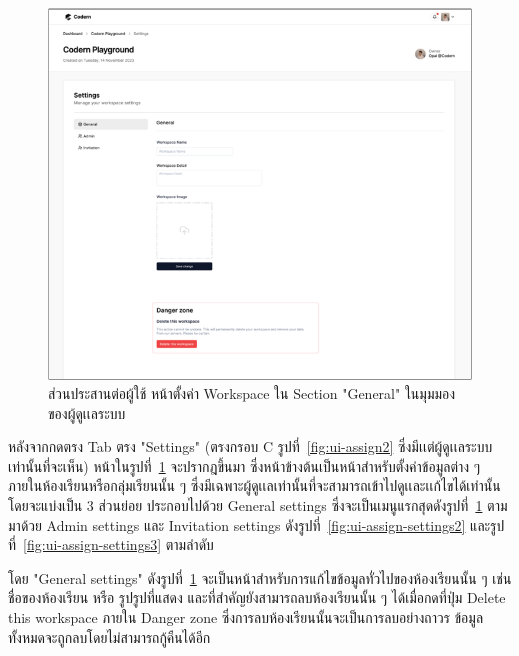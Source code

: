 \documentclass[12pt,one side,openright,a4paper]{cpe-thesis-th}
\newcommand{\thaijustify}[1]{%
  \par\hspace{30pt}\justifying
  #1
}
\begin{document}
    \hypertarget{ui-assign-settings1}{
        \begin{figure}[H]
        \centering
            \includegraphics[width=15cm]{figure/ui/ui-assign-settings1.png}
            \caption[ส่วนประสานต่อผู้ใช้ หน้าตั้งค่า Workspace ใน Section "General" ในมุมมองของผู้ดูเเลระบบ]{ส่วนประสานต่อผู้ใช้ หน้าตั้งค่า Workspace ใน Section "General" ในมุมมองของผู้ดูเเลระบบ}
            \label{fig:ui-assign-settings1}
        \end{figure}
    }
    \thaijustify{
         หลังจากกดตรง Tab ตรง "Settings" (ตรงกรอบ C รูปที่~\ref{fig:ui-assign2} ซึ่งมีเเต่ผู้ดูเเลระบบเท่านั้นที่จะเห็น) หน้าในรูปที่~\ref{fig:ui-assign-settings1} จะปรากฎขึ้นมา ซึ่งหน้าข้างต้นเป็นหน้าสำหรับตั้งค่าข้อมูลต่าง ๆ ภายในห้องเรียนหรือกลุ่มเรียนนั้น ๆ ซึ่งมีเฉพาะผู้ดูเเลเท่านั้นที่จะสามารถเข้าไปดูเเละเเก้ไขได้เท่านั้น โดยจะแบ่งเป็น 3 ส่วนย่อย ประกอบไปด้วย General settings ซึ่งจะเป็นเมนูแรกสุดดังรูปที่~\ref{fig:ui-assign-settings1} ตามมาด้วย Admin settings และ Invitation settings ดังรูปที่~\ref{fig:ui-assign-settings2} และรูปที่~\ref{fig:ui-assign-settings3} ตามลำดับ
    }
    \thaijustify{
        โดย "General settings" ดังรูปที่~\ref{fig:ui-assign-settings1} จะเป็นหน้าสำหรับการแก้ไขข้อมูลทั่วไปของห้องเรียนนั้น ๆ เช่น ชื่อของห้องเรียน หรือ รูปรูปที่แสดง และที่สำคัญยังสามารถลบห้องเรียนนั้น ๆ ได้เมื่อกดที่ปุ่ม Delete this workspace ภายใน Danger zone ซึ่งการลบห้องเรียนนั้นจะเป็นการลบอย่างถาวร ข้อมูลทั้งหมดจะถูกลบโดยไม่สามารถกู้คืนได้อีก 
    }
\end{document}
